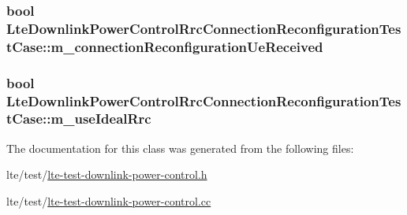 \subsubsection[{\texorpdfstring{m\+\_\+connection\+Reconfiguration\+Ue\+Received}{m_connectionReconfigurationUeReceived}}]{\setlength{\rightskip}{0pt plus 5cm}bool Lte\+Downlink\+Power\+Control\+Rrc\+Connection\+Reconfiguration\+Test\+Case\+::m\+\_\+connection\+Reconfiguration\+Ue\+Received\hspace{0.3cm}{\ttfamily [private]}}\hypertarget{classLteDownlinkPowerControlRrcConnectionReconfigurationTestCase_aa440780c8ea103c1e12b13b27fb0fef8}{}\label{classLteDownlinkPowerControlRrcConnectionReconfigurationTestCase_aa440780c8ea103c1e12b13b27fb0fef8}
\subsubsection[{\texorpdfstring{m\+\_\+use\+Ideal\+Rrc}{m_useIdealRrc}}]{\setlength{\rightskip}{0pt plus 5cm}bool Lte\+Downlink\+Power\+Control\+Rrc\+Connection\+Reconfiguration\+Test\+Case\+::m\+\_\+use\+Ideal\+Rrc\hspace{0.3cm}{\ttfamily [private]}}\hypertarget{classLteDownlinkPowerControlRrcConnectionReconfigurationTestCase_a9bd92ca03c62b95b5871c6ce5ad5beac}{}\label{classLteDownlinkPowerControlRrcConnectionReconfigurationTestCase_a9bd92ca03c62b95b5871c6ce5ad5beac}


The documentation for this class was generated from the following files\+:\begin{DoxyCompactItemize}
\item 
lte/test/\hyperlink{lte-test-downlink-power-control_8h}{lte-\/test-\/downlink-\/power-\/control.\+h}\item 
lte/test/\hyperlink{lte-test-downlink-power-control_8cc}{lte-\/test-\/downlink-\/power-\/control.\+cc}\end{DoxyCompactItemize}
